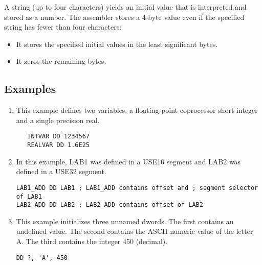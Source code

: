 A string (up to four characters) yields an initial value that is interpreted and stored as a number. The assembler stores a 4-byte value even if the specified string has fewer than four characters: 
\begin{itemize}
\item It stores the specified initial values in the least significant bytes. 
\item It zeros the remaining bytes.
\end{itemize}

\subsection*{Examples}
\begin{enumerate}
\item This example defines two variables, a floating-point coprocessor short integer and a single precision real.
\begin{verbatim}
   INTVAR DD 1234567
   REALVAR DD 1.6E25
\end{verbatim}
\item In this example, LAB1 was defined in a USE16 segment and LAB2 was defined in a USE32 segment.
\begin{verbatim}
LAB1_ADD DD LAB1 ; LAB1_ADD contains offset and ; segment selector of LAB1
LAB2_ADD DD LAB2 ; LAB2_ADD contains offset of LAB2
\end{verbatim}
\item This example initializes three unnamed dwords. The first contains an undefined value. The second contains the ASCII numeric value of the letter A. The third contains the integer 450 (decimal).
\begin{verbatim}
DD ?, 'A', 450
\end{verbatim}
\end{enumerate}